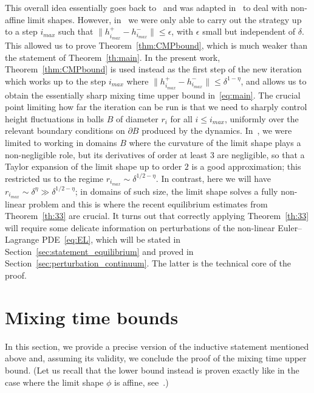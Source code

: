 \documentclass[AHL,Unicode,longabstracts,published]{cedram}
\begin{document}
This overall idea essentially goes back to~\cite{CMT} and was adapted in~\cite{LT_cmp} to deal with non-affine limit shapes. However, in~\cite{LT_cmp} we were only able to carry out the strategy up to a step $i_{max}$ such that $\| h^+_{i_{max}} - h^-_{i_{max}} \|\le \epsilon$, with $\epsilon$ small but independent of $\delta$. This allowed us to prove
Theorem~\ref{thm:CMPbound}, which is much weaker than the statement of Theorem~\ref{th:main}. In the present work, Theorem~\ref{thm:CMPbound} is used instead as the first step of the new iteration which works up to the step $i_{max}$ where $\| h^+_{i_{max}} - h^-_{i_{max}} \|\le \delta^{1-\eta}$, and allows us to obtain the essentially sharp mixing time upper bound in~\eqref{eq:main}. The crucial point limiting how far the iteration can be run is that we need to sharply control height fluctuations in balls $B$ of diameter $r_i$ for all $i\le i_{max}$, uniformly over the relevant boundary conditions on $\partial B$ produced by the dynamics. In~\cite{LT_cmp}, we were limited to working in domains $B$ where the curvature of the limit shape plays a non-negligible role, but its derivatives of order at least $3$ are negligible, so that a Taylor expansion of the limit shape up to order $2$ is a good approximation; this restricted us to the regime $r_{i_{max}} \sim \delta^{1/2-\eta}$. In contrast, here we will have $r_{i_{max}} \sim \delta^{\eta}\gg \delta^{1/2-\eta}$; in domains of such size, the limit shape solves a fully non-linear problem and this is where the recent equilibrium estimates from Theorem~\ref{th:33} are crucial. It turns out that correctly applying Theorem~\ref{th:33} will require some delicate information on perturbations of the non-linear Euler--Lagrange PDE~\eqref{eq:EL}, which will be stated in
Section~\ref{sec:statement_equilibrium} and proved in
Section~\ref{sec:perturbation_continuum}. The latter is the technical core of the proof.



\section{Mixing time bounds}\label{sec:UB}

In this section, we provide a precise version of the inductive statement mentioned above and, assuming its validity, we conclude the proof of the mixing time upper bound. (Let us recall that the lower bound instead is proven exactly like in the case where the limit shape $\phi$ is affine, see~\cite[Sec.~5.2]{LT_ptrf}.)
\end{document}
